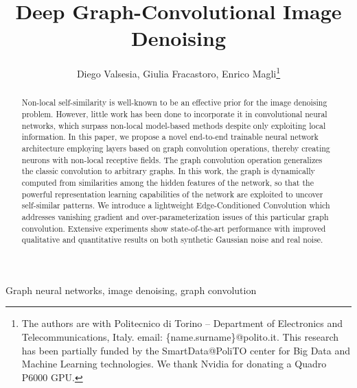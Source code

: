 \documentclass[journal]{IEEEtran}
\begin{document}
\title{Deep Graph-Convolutional Image Denoising}

\author{Diego Valsesia,
        Giulia Fracastoro,
        Enrico Magli\thanks{The authors are with Politecnico di Torino -- Department of Electronics and Telecommunications, Italy. email: \{name.surname\}@polito.it. This research has been partially funded by the SmartData@PoliTO center for Big Data and Machine Learning technologies. We thank Nvidia for donating a Quadro P6000 GPU.} }


















\maketitle

\begin{abstract}
Non-local self-similarity is well-known to be an effective prior for the image denoising problem. However, little work has been done to incorporate it in convolutional neural networks, which surpass non-local model-based methods despite only exploiting local information. In this paper, we propose a novel end-to-end trainable neural network architecture employing layers based on graph convolution operations, thereby creating neurons with non-local receptive fields. The graph convolution operation generalizes the classic convolution to arbitrary graphs. In this work, the graph is dynamically computed from similarities among the hidden features of the network, so that the powerful representation learning capabilities of the network are exploited to uncover self-similar patterns. We introduce a lightweight Edge-Conditioned Convolution which addresses vanishing gradient and over-parameterization issues of this particular graph convolution. Extensive experiments show state-of-the-art performance with improved qualitative and quantitative results on both synthetic Gaussian noise and real noise.
\end{abstract}

\begin{IEEEkeywords}
Graph neural networks, image denoising, graph convolution
\end{IEEEkeywords}



\IEEEpeerreviewmaketitle
\end{document}
